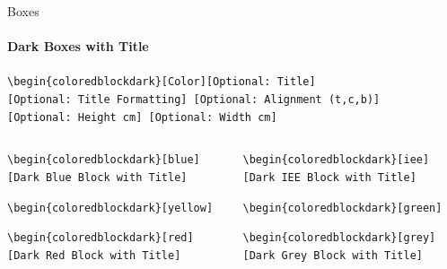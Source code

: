 \documentclass[aspectratio=169]{beamer}
\begin{document}
\begin{frame}{Boxes}
    \framesubtitle{Dark Boxes with Title}

    \begin{coloredblock}[grey]
        \footnotesize\centering\texttt{\textbackslash begin\{coloredblockdark\}[Color][Optional:~Title][Optional:~Title~Formatting] [Optional:~Alignment (t,c,b)][Optional:~Height~cm] [Optional:~Width~cm]}
    \end{coloredblock}

    \vspace{-1cm}
    \begin{columns}
        \begin{column}{0.49\textwidth}
    
            \begin{coloredblockdark}
                \footnotesize\texttt{\textbackslash begin\{coloredblockdark\}[blue][Dark Blue Block with Title]}\strut
            \end{coloredblockdark}
    
            \begin{coloredblockdark}
                \footnotesize\texttt{\textbackslash begin\{coloredblockdark\}[yellow]}\strut
            \end{coloredblockdark}
    
            \begin{coloredblockdark}
                \footnotesize\texttt{\textbackslash begin\{coloredblockdark\}[red][Dark Red Block with Title]}\strut
            \end{coloredblockdark}
        
        \end{column}
        \begin{column}{0.49\textwidth}
    
            \begin{coloredblockdark}
                \footnotesize\texttt{\textbackslash begin\{coloredblockdark\}[iee][Dark IEE Block with Title]}\strut
            \end{coloredblockdark}
    
            \begin{coloredblockdark}
                \footnotesize\texttt{\textbackslash begin\{coloredblockdark\}[green]}\strut
            \end{coloredblockdark}
    
            \begin{coloredblockdark}
                \footnotesize\texttt{\textbackslash begin\{coloredblockdark\}[grey][Dark Grey Block with Title]}\strut
            \end{coloredblockdark}
        
        \end{column}
    \end{columns}
\end{frame}
\end{document}
